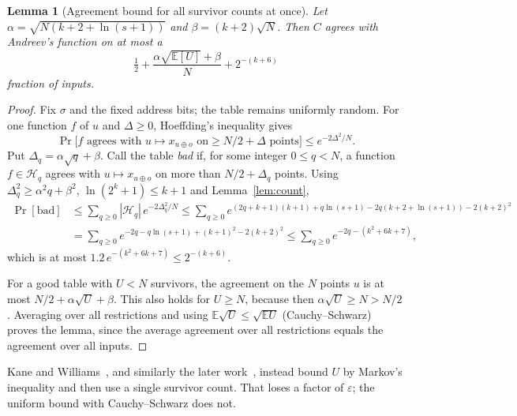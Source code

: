 \documentclass[11pt,letterpaper]{article}
\newtheorem{lemma}[theorem]{Lemma}
\theoremstyle{remark}
\newcommand{\cH}{\mathcal H}
\begin{document}
\begin{lemma}[Agreement bound for all survivor counts at once]\label{lem:avg}
Let $\alpha=\sqrt{N(k+2+\ln(s+1))}$ and $\beta=(k+2)\sqrt N$. Then $C$
agrees with Andreev's function on at most a
\[
\tfrac12+\frac{\alpha\sqrt{\mathbb E[U]}+\beta}{N}+2^{-(k+6)}
\]
fraction of inputs.
\end{lemma}
\begin{proof}
Fix $\sigma$ and the fixed address bits; the table remains uniformly random.
For one function $f$ of $u$ and $\Delta\ge0$, Hoeffding's inequality gives
\[
\Pr\bigl[f\text{ agrees with }u\mapsto x_{u\oplus o}\text{ on}\ge N/2+\Delta\text{ points}\bigr]
\le e^{-2\Delta^2/N}.
\]
Put $\Delta_q=\alpha\sqrt q+\beta$. Call the table \emph{bad} if, for some
integer $0\le q<N$, a function $f\in\cH_q$ agrees with
$u\mapsto x_{u\oplus o}$ on more than $N/2+\Delta_q$ points. Using $\Delta_q^2\ge\alpha^2q+\beta^2$,
$\ln(2^k+1)\le k+1$ and Lemma~\ref{lem:count},
\begin{align*}
\Pr[\text{bad}]&\le\sum_{q\ge0}|\cH_q|\,e^{-2\Delta_q^2/N}
\le\sum_{q\ge0}e^{(2q+k+1)(k+1)+q\ln(s+1)-2q(k+2+\ln(s+1))-2(k+2)^2}\\
&=\sum_{q\ge0}e^{-2q-q\ln(s+1)+(k+1)^2-2(k+2)^2}
\le\sum_{q\ge0}e^{-2q-(k^2+6k+7)},
\end{align*}
which is at most $1.2\,e^{-(k^2+6k+7)}\le2^{-(k+6)}$.

For a good table with $U<N$ survivors, the agreement on the $N$ points $u$
is at most $N/2+\alpha\sqrt U+\beta$. This also holds for $U\ge N$, because
then $\alpha\sqrt U\ge N>N/2$. Averaging over all restrictions
and using $\mathbb E\sqrt U\le\sqrt{\mathbb E U}$ (Cauchy--Schwarz) proves
the lemma, since the average agreement over all restrictions equals the
agreement over all inputs.
\end{proof}
Kane and Williams~\cite{KW}, and similarly the later
work~\cite{KKL,CSS}, instead bound $U$
by Markov's inequality and then use a single survivor count. That loses a
factor of $\varepsilon$; the uniform bound with Cauchy--Schwarz does not.
\end{document}
